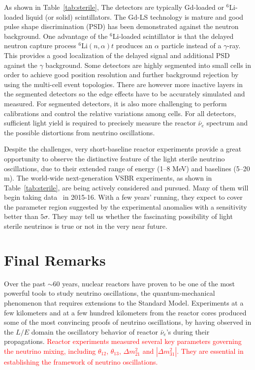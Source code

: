 \documentclass[aps,twocolumn,preprintnumbers,amsmath,superscriptaddress,amssymb,floats,nofootinbib]{revtex4-1}
\begin{document}
As shown in Table~\ref{tab:sterile}, The detectors are typically Gd-loaded or $^{6}$Li-loaded liquid (or solid) scintillators. 
The Gd-LS technology is mature and good pulse shape discrimination (PSD) has been demonstrated against the neutron background. One advantage of the $^{6}$Li-loaded scintillator is that the delayed neutron capture process $^{6}$Li$(n,\alpha)t$ produces an $\alpha$ particle instead of a $\gamma$-ray. 
This provides a good localization of the delayed signal and additional PSD against the $\gamma$ background. 
Some detectors are highly segmented into small cells in order to achieve good position resolution and further background rejection by using the multi-cell event topologies. 
There are however more inactive layers in the segmented detectors so the edge effects have to be accurately simulated and measured.
For segmented detectors, it is also more challenging to perform calibrations and control the relative variations among cells. 
For all detectors, sufficient light yield is required to precisely measure the reactor $\bar\nu_e$ spectrum and the possible distortions from neutrino oscillations.


Despite the challenges, very short-baseline reactor experiments provide a great opportunity to observe the distinctive feature of the light sterile neutrino oscillations, due to their extended range of energy (1--8 MeV) and baselines (5--20 m). 
The world-wide next-generation VSBR experiments, as shown in Table~\ref{tab:sterile}, are being actively considered and pursued.
Many of them will begin taking data~\cite{Lhuillier-Neutrino14} in 2015-16. With a few years' running, they expect to cover the parameter region suggested by the experimental anomalies with a sensitivity better than $5\sigma$. 
They may tell us whether the fascinating possibility of light sterile neutrinos is true or not in the very near future.


\section{Final Remarks} 
\label{sec:final}

Over the past $\sim$60 years, nuclear reactors have proven to be one of the most powerful tools to study neutrino oscillations, the quantum-mechanical phenomenon that requires extensions to the Standard Model. Experiments at a few kilometers and at a few hundred kilometers from the reactor cores produced some of the most convincing proofs of neutrino oscillations, by having observed in the $L/E$ domain the oscillatory behavior of reactor $\bar\nu_e$'s during their propagations. \textcolor{red}{Reactor experiments measured several key parameters governing the neutrino mixing, including $\theta_{12}$, $\theta_{13}$, $\Delta{m}^2_{21}$ and $|\Delta{m}^2_{31}|$. They are essential in establishing the framework of neutrino oscillations.}
\end{document}
